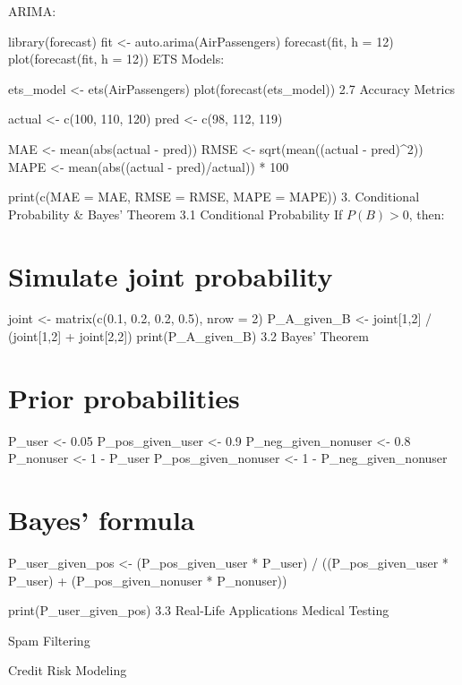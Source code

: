\documentclass[
  letterpaper,
  DIV=11,
  numbers=noendperiod]{scrreprt}
\begin{document}
{ARIMA:

library(forecast) fit \textless- auto.arima(AirPassengers) forecast(fit,
h = 12) plot(forecast(fit, h = 12)) ETS Models:

ets\_model \textless- ets(AirPassengers) plot(forecast(ets\_model)) 2.7
Accuracy Metrics

actual \textless- c(100, 110, 120) pred \textless- c(98, 112, 119)

MAE \textless- mean(abs(actual - pred)) RMSE \textless-
sqrt(mean((actual - pred)\^{}2)) MAPE \textless- mean(abs((actual -
pred)/actual)) * 100

print(c(MAE = MAE, RMSE = RMSE, MAPE = MAPE)) 3. Conditional Probability
\& Bayes' Theorem 3.1 Conditional Probability If \(P(B) > 0\), then:


\chapter{Simulate joint probability}\label{simulate-joint-probability}

joint \textless- matrix(c(0.1, 0.2, 0.2, 0.5), nrow = 2) P\_A\_given\_B
\textless- joint{[}1,2{]} / (joint{[}1,2{]} + joint{[}2,2{]})
print(P\_A\_given\_B) 3.2 Bayes' Theorem


\chapter{Prior probabilities}\label{prior-probabilities}

P\_user \textless- 0.05 P\_pos\_given\_user \textless- 0.9
P\_neg\_given\_nonuser \textless- 0.8 P\_nonuser \textless- 1 - P\_user
P\_pos\_given\_nonuser \textless- 1 - P\_neg\_given\_nonuser


\chapter{Bayes' formula}\label{bayes-formula}

P\_user\_given\_pos \textless- (P\_pos\_given\_user * P\_user) /
((P\_pos\_given\_user * P\_user) + (P\_pos\_given\_nonuser *
P\_nonuser))

print(P\_user\_given\_pos) 3.3 Real-Life Applications Medical Testing

Spam Filtering

Credit Risk Modeling

}
\end{document}
